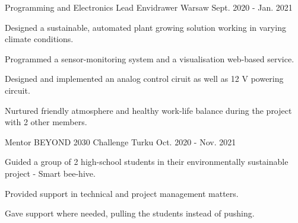 

\begin{cventries}

    \cventry
    {Programming and Electronics Lead} %
    {Envidrawer} %
    {Warsaw} %
    {Sept. 2020 - Jan. 2021} %
    {
      \begin{cvitems} %
        \item {Designed a sustainable, automated plant growing solution working in varying climate conditions.}
        \item {Programmed a sensor-monitoring system and a visualisation web-based service.}
        \item {Designed and implemented an analog control ciruit as well as 12 V powering circuit.}
        \item {Nurtured friendly atmosphere and healthy work-life balance during the project with 2 other members.}
      \end{cvitems}
    }

    \cventry
    {Mentor} %
    {BEYOND 2030 Challenge} %
    {Turku} %
    {Oct. 2020 - Nov. 2021} %
    {
      \begin{cvitems} %
        \item {Guided a group of 2 high-school students in their environmentally sustainable project - Smart bee-hive.}
        \item {Provided support in technical and project management matters.}
        \item {Gave support where needed, pulling the students instead of pushing.}
      \end{cvitems}
    }


\end{cventries}
